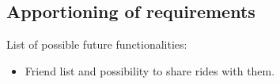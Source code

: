 \subsection{Apportioning of requirements}
List of possible future functionalities:
\begin{itemize}
\item Friend list and possibility to share rides with them.
\end{itemize}